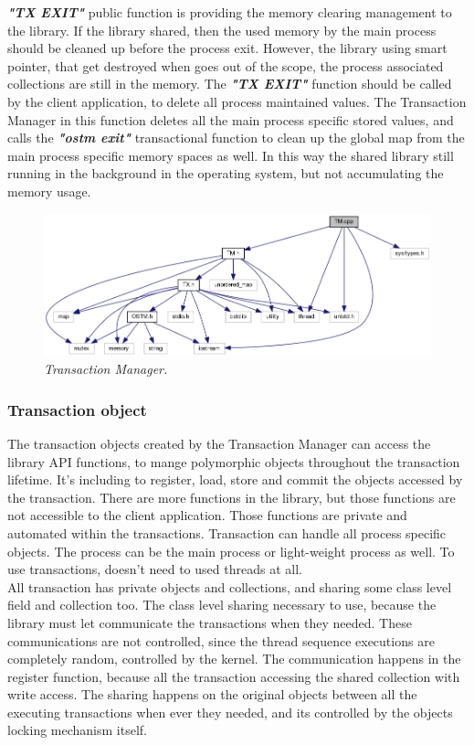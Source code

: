 \documentclass[12pt]{article}
\begin{document}
\textbf{\textit{"TX EXIT"}} public function is providing the memory clearing management to the library. If the library shared, then the used memory by the main process should be cleaned up before the process exit. However, the library using smart pointer, that get destroyed when goes out of the scope, the process associated collections are still in the memory. The \textbf{\textit{"TX EXIT"}} function should be called by the client application, to delete all process maintained values. The Transaction Manager in this function deletes all the main process specific stored values, and calls the \textbf{\textit{"ostm exit"}} transactional function to clean up the global map from the main process specific memory spaces as well. In this way the shared library still running in the background in the operating system, but not accumulating the memory usage. \\ 


\begin{figure}[h!]
\centering
\includegraphics[scale=0.4]{Pictures/TM.png}
\caption*{\textit{\color{gray}Transaction Manager.}}
\end{figure}

\subsubsection{Transaction object}
The transaction objects created by the Transaction Manager can access the library API functions, to mange polymorphic objects throughout the transaction lifetime. It's including to register, load, store and commit the objects accessed by the transaction. There are more functions in the library, but those functions are not accessible to the client application. Those functions are private and automated within the transactions. Transaction can handle all process specific objects. The process can be the main process or light-weight process as well. To use transactions, doesn't need to used threads at all.\\

All transaction has private objects and collections, and sharing some class level field and collection too. The class level sharing necessary to use, because the library must let communicate the transactions when they needed. These communications are not controlled, since the thread sequence executions are completely random, controlled by the kernel. The communication happens in the register function, because all the transaction accessing the shared collection with write access. The sharing happens on the original objects between all the executing transactions when ever they needed, and its controlled by the objects locking mechanism itself.  
\end{document}
